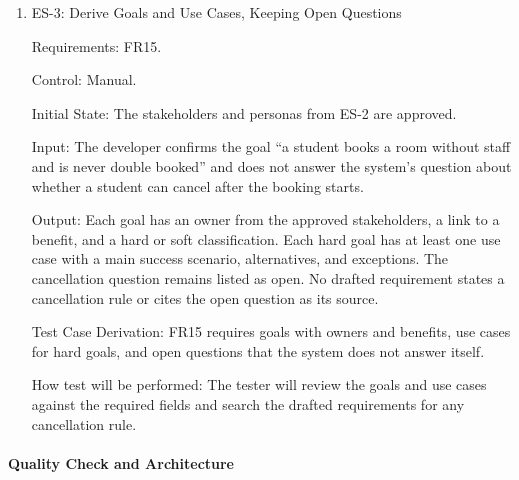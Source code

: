 \documentclass[12pt, titlepage]{article}
\begin{document}
\begin{enumerate}
Test Case Derivation: FR14 requires stakeholders and personas for the key user
groups, approved by the developer.

How test will be performed: The tester submits the descriptions, checks the
feedback against the missing information, provides the requested details, and
approves the result. The tester then checks that the stored information matches
the supplied descriptions and that each persona references the correct
stakeholder.

\item{ES-3: Derive Goals and Use Cases, Keeping Open Questions\\}

Requirements: FR15.

Control: Manual.

Initial State: The stakeholders and personas from ES-2 are approved.

Input: The developer confirms the goal ``a student books a room without staff
and is never double booked'' and does not answer the system's question about
whether a student can cancel after the booking starts.

Output: Each goal has an owner from the approved stakeholders, a link to a
benefit, and a hard or soft classification. Each hard goal has at least one
use case with a main success scenario, alternatives, and exceptions. The
cancellation question remains listed as open. No drafted requirement states a
cancellation rule or cites the open question as its source.

Test Case Derivation: FR15 requires goals with owners and benefits, use cases
for hard goals, and open questions that the system does not answer itself.

How test will be performed: The tester will review the goals and use cases
against the required fields and search the drafted requirements for any
cancellation rule.

\end{enumerate}

\paragraph{Quality Check and Architecture}
\end{document}
